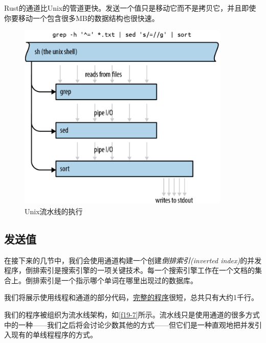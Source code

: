 Rust的通道比Unix的管道更快。发送一个值只是移动它而不是拷贝它，并且即使你要移动一个包含很多MB的数据结构也很快速。

\begin{figure}[htbp]
    \centering
    \includegraphics[width=0.9\textwidth]{../img/f19-6.png}
    \caption{Unix流水线的执行}
    \label{f19-6}
\end{figure}

\subsection{发送值}
在接下来的几节中，我们会使用通道构建一个创建\emph{倒排索引(inverted index)}的并发程序，倒排索引是搜索引擎的一项关键技术。每一个搜索引擎工作在一个文档的集合上。倒排索引是一个指示哪个单词在哪里出现过的数据库。

我们将展示使用线程和通道的部分代码，\href{https://github.com/ProgrammingRust/fingertips}{完整的程序}很短，总共只有大约1千行。

我们的程序被组织为流水线架构，如\autoref{f19-7}所示。流水线只是使用通道的很多方式中的一种——我们之后将会讨论少数其他的方式——但它们是一种直观地把并发引入现有的单线程程序的方式。

